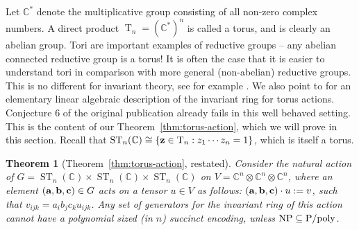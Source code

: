 \documentclass[10pt,a4paper]{article}
\newtheorem{theorem}{Theorem}
\newcommand{\C}{\mathbb C}
\newcommand{\T}{\operatorname T}
\newcommand{\ST}{\operatorname{ST}}
\newcommand{\ba}{\textbf a}
\newcommand{\bb}{\textbf b}
\newcommand{\bc}{\textbf c}
\newcommand{\bz}{\textbf z}
\begin{document}
Let $\C^*$ denote the multiplicative group consisting of all non-zero
complex numbers. A direct product $\T_n = (\C^*)^n$ is called a torus, and
is clearly an abelian group. Tori are important examples of reductive
groups -- any abelian connected reductive group is a torus! It is often the case that it is easier to understand tori in comparison with more general (non-abelian) reductive groups. This is no different for invariant theory, see for example \cite{DK,Wehlau}. We also point to \cite[Proposition~3.3]{DM-exp} for an elementary linear algebraic description of the invariant ring for torus actions. Conjecture 6 of the original publication already fails in this well behaved setting.
This is the content of our Theorem~\ref{thm:torus-action}, which we will prove in this section.
Recall that $\ST_n(\C) \cong \{ \bz \in \T_n : z_1\cdots z_n = 1 \}$, which is itself a torus.

\begin{theorem}[Theorem~\ref{thm:torus-action}, restated]
	Consider the natural action of $G = \ST_n(\C) \times \ST_n(\C) \times \ST_n(\C)$
	on $V = \C^n \otimes \C^n \otimes \C^n$, where an element
	$(\ba, \bb, \bc) \in G$ acts on a tensor $u \in V$ as follows:
  $(\ba,\bb,\bc) \cdot u := v$, such that
	$v_{ijk} = a_i b_j c_k u_{ijk}$. Any set of generators
	for the invariant ring of this action cannot have a polynomial sized
	(in $n$) succinct encoding, unless ${\rm NP \subseteq P/poly}$.
\end{theorem}
\end{document}
